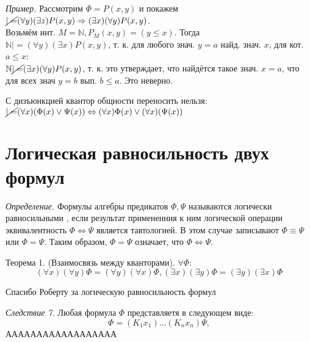 \documentclass{SCWorks}
\begin{document}
\par {\it Пример.} Рассмотрим $\Phi = P(x, y)$ и покажем \\
$\cancel{|=} (\forall y)(\exists z)P(x, y) \Rightarrow (\exists x)(\forall y)P(x, y)$. \\
Возьмём инт. $M = \mathbb{N}, P_M(x, y) = (y \leq x)$. Тогда \\
$\mathbb{N} |= (\forall y)(\exists x)P(x, y)$, т. к. для любого знач. $y = a$ найд. знач. $x$, для кот. $a \leq x$: \\
$\mathbb{N} \cancel{|=} (\exists x)(\forall y)P(x, y)$, т. к. это утверждает, что найдётся такое знач. $x = a$, что для всех знач $y = b$ вып. $b \leq a$. Это неверно.
\par С дизъюнкцией квантор общности переносить нельзя: $\cancel{|=} (\forall x)(\Phi(x)\lor\Psi(x)) \Leftrightarrow (\forall x)\Phi(x) \lor (\forall x)(\Psi(x))$

\section{Логическая равносильность двух формул}
\par {\it Определение.} Формулы алгебры предикатов  $\Phi, \Psi$ называются логически равносильными
, если результат примененния к ним логической операции эквивалентность $\Phi \Leftrightarrow \Psi$ является тавтологией.
В этом случае записывают $\Phi \equiv \Psi$ или $\Phi = \Psi$.
Таким образом, $\Phi = \Psi$ означает, что $\Phi \Leftrightarrow \Psi$.

Теорема 1. (Взаимосвязь между кванторами).
$\forall \Phi$:
\begin{equation*}
    (\forall x)(\forall y) \Phi = (\forall y)(\forall x)\Phi, (\exists x)(\exists y) \Phi = (\exists y)(\exists x)\Phi
\end{equation*}

Спасибо Роберту за логическую равносильность формул

\par {\it Следствие 7.} Любая формула $\Phi$ представляетя в следующем виде:
\begin{equation*}
    \Phi = (K_1 x_1)\dots(K_n x_n)\Psi,
\end{equation*}
АААААААААААААААААА
\end{document}
